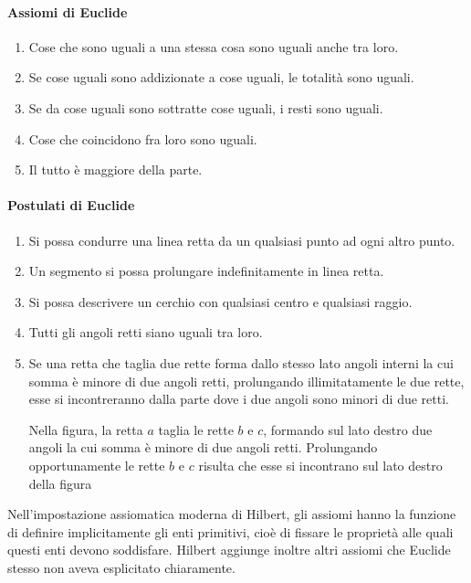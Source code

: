 \paragraph{Assiomi di Euclide}
\begin{enumerate}[label=\Roman{*}.]
\item Cose che sono uguali a una stessa cosa sono uguali anche tra loro.
\item Se cose uguali sono addizionate a cose uguali, le totalità sono uguali.
\item Se da cose uguali sono sottratte cose uguali, i resti sono uguali.
\item Cose che coincidono fra loro sono uguali.
\item Il tutto è maggiore della parte.
\end{enumerate}

\paragraph{Postulati di Euclide}
\begin{enumerate}[label=\Roman{*}.]
\item Si possa condurre una linea retta da un qualsiasi punto ad ogni altro punto.
\item Un segmento si possa prolungare indefinitamente in linea retta.
\item Si possa descrivere un cerchio con qualsiasi centro e qualsiasi raggio.
\item Tutti gli angoli retti siano uguali tra loro.
\item Se una retta che taglia due rette forma dallo stesso lato angoli interni la cui somma è minore di due angoli retti, prolungando illimitatamente le due rette, esse si incontreranno dalla parte dove i due angoli sono minori di due retti.

 \begin{minipage}{.45\textwidth}
 \centering
 \end{minipage}\hfil
 \begin{minipage}{.45\textwidth}
 Nella figura, la retta $a$ taglia le rette $b$ e $c$, formando sul lato destro due angoli la cui somma è minore di due angoli retti. Prolungando opportunamente le rette $b$ e $c$ risulta che esse si incontrano sul lato destro della figura
  \end{minipage}
\end{enumerate}

Nell'impostazione assiomatica moderna di Hilbert, gli assiomi hanno la funzione di definire implicitamente gli enti primitivi, cioè di fissare le proprietà alle quali questi enti devono soddisfare. Hilbert aggiunge inoltre altri assiomi che Euclide stesso non aveva esplicitato chiaramente.


